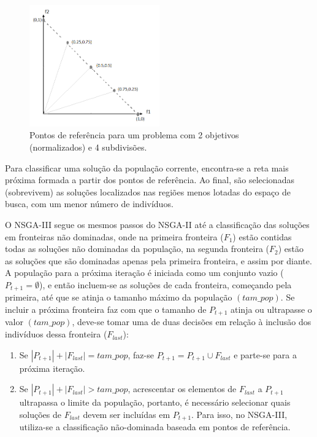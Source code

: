 \begin{figure}[!htbp]
	\centering
	\includegraphics[width=0.5\textwidth]{cap_otimizacao-multi/figs/nsga3}
	\caption{\label{fig_nsga3}Pontos de referência para um problema com 2 objetivos (normalizados) e 4 subdivisões.}
\end{figure}

Para classificar uma solução da população corrente, encontra-se a reta mais próxima formada a partir dos pontos de referência. Ao final, são selecionadas (sobrevivem) as soluções localizados nas regiões menos lotadas do espaço de busca, com um menor número de indivíduos.

O NSGA-III segue os mesmos passos do NSGA-II até a classificação das soluções em fronteiras não dominadas, onde na primeira fronteira ($F_1$) estão contidas todas as soluções não dominadas da população, na segunda fronteira ($F_2$) estão as soluções que são dominadas apenas pela primeira fronteira, e assim por diante. A população para a próxima iteração é iniciada como um conjunto vazio ($P_{t+1} = \emptyset$), e então incluem-se as soluções de cada fronteira, começando pela primeira, até que se atinja o tamanho máximo da população $(tam\_pop)$. Se incluir a próxima fronteira faz com que o tamanho de $P_{t+1}$ atinja ou ultrapasse o valor $(tam\_pop)$, deve-se tomar uma de duas decisões em relação à inclusão dos indivíduos dessa fronteira ($F_{last}$):

\begin{enumerate}
	\item Se $|P_{t+1}| + |F_{last}| = tam\_pop$, faz-se $P_{t+1} = P_{t+1} \cup F_{last}$ e parte-se para a próxima iteração.
	\item Se $|P_{t+1}| + |F_{last}| > tam\_pop$, acrescentar os elementos de $F_{last}$ a $P_{t+1}$ ultrapassa o limite da população, portanto, é necessário selecionar quais soluções de $F_{last}$ devem ser incluídas em $P_{t+1}$. Para isso, no NSGA-III, utiliza-se a classificação não-dominada baseada em pontos de referência.
\end{enumerate}

